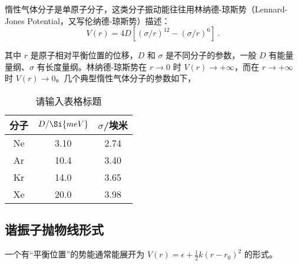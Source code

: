 
惰性气体分子是单原子分子，这类分子振动能往往用林纳德-琼斯势（Lennard-Jones Potential，又写伦纳德-琼斯势）描述：
\begin{equation}
V(r) = 4 D\left[(\sigma / r)^{12} - (\sigma/r)^6\right] ~.
\end{equation}

其中 $r$ 是原子相对平衡位置的位移，$D$ 和 $\sigma$ 是不同分子的参数，一般 $D$ 有能量量纲、$\sigma$ 有长度量纲。林纳德-琼斯势在 $r \rightarrow 0$ 时 $V(r) \rightarrow +\infty$，而在 $r \rightarrow +\infty$ 时 $V(r) \rightarrow 0$。几个典型惰性气体分子的参数如下，
\begin{table}[ht]
\centering
\caption{请输入表格标题}\label{tab_LenJoP1}
\begin{tabular}{|c|c|c|}
\hline
分子 & $D/\Si{meV}$ & $\sigma$/埃米 \\
\hline
Ne & 3.10 & 2.74 \\
\hline
Ar & 10.4 & 3.40 \\
\hline
Kr & 14.0 & 3.65 \\
\hline
Xe & 20.0 & 3.98 \\
\hline
\end{tabular}
\end{table}


\subsection{谐振子抛物线形式}
一个有“平衡位置”的势能通常能展开为 $V(r) = \epsilon + \frac{1}2 k (r-r_0)^2$ 的形式。